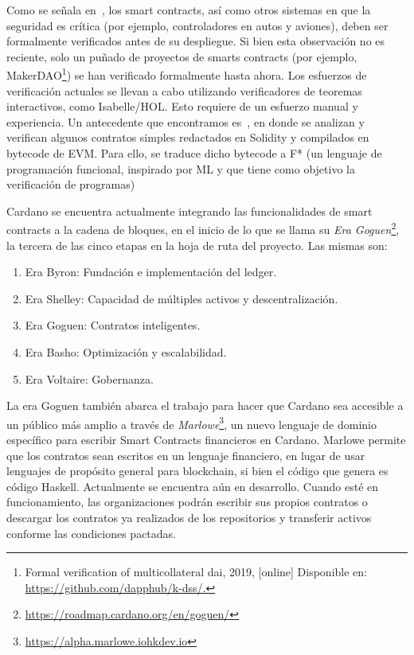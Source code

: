\documentclass[12pt]{book}
\begin{document}
Como se señala en~\cite{9152791}, los smart contracts, así como otros sistemas en que la seguridad es crítica (por ejemplo, controladores en autos y aviones), deben ser formalmente verificados antes de su despliegue. Si bien esta observación no es reciente, solo un puñado de proyectos de smarts contracts (por ejemplo, MakerDAO\footnote{Formal verification of multicollateral dai, 2019, [online] Disponible en: \href{https://github.com/dapphub/k-dss/.}{https://github.com/dapphub/k-dss/.}}) se han verificado formalmente hasta ahora. Los esfuerzos de verificación actuales se llevan a cabo utilizando verificadores de teoremas interactivos, como Isabelle/HOL. Esto requiere de un esfuerzo manual y experiencia. Un antecedente que encontramos es~\cite{bhargavan:hal-01400469}, en donde se analizan y verifican algunos contratos simples redactados en Solidity y compilados en bytecode de EVM. Para ello, se traduce dicho bytecode a F* (un lenguaje de programación funcional, inspirado por ML y que tiene como objetivo la verificación de programas)

Cardano se encuentra actualmente integrando las funcionalidades de smart contracts a la cadena de bloques, en el inicio de lo que se llama su \textit{Era Goguen}\footnote{\href{https://roadmap.cardano.org/en/goguen/}{https://roadmap.cardano.org/en/goguen/}}, la tercera de las cinco etapas en la hoja de ruta del proyecto. Las mismas son:

\begin{enumerate}
    \item Era Byron: Fundación e implementación del ledger.
    \item Era Shelley: Capacidad de múltiples activos y descentralización.
    \item Era Goguen: Contratos inteligentes.
    \item Era Basho: Optimización y escalabilidad.
    \item Era Voltaire: Gobernanza.
\end{enumerate}

La era Goguen también abarca el trabajo para hacer que Cardano sea accesible a un público más amplio a través de \textit{Marlowe}\footnote{\href{https://alpha.marlowe.iohkdev.io/#/}{https://alpha.marlowe.iohkdev.io}}, un nuevo lenguaje de dominio específico para escribir Smart Contracts financieros en Cardano. Marlowe permite que los contratos sean escritos en un lenguaje financiero, en lugar de usar lenguajes de propósito general para blockchain, si bien el código que genera es código Haskell. Actualmente se encuentra aún en desarrollo. Cuando esté en funcionamiento, las organizaciones podrán escribir sus propios contratos o descargar los contratos ya realizados de los repositorios y transferir activos conforme las condiciones pactadas.
\end{document}
